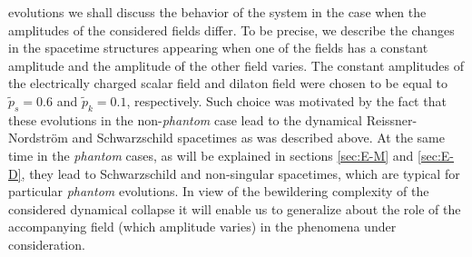\documentclass[aps,showpacs,nofootinbib,floatfix]{revtex4}
\newcommand{\tpe}{{\tilde p}}
\begin{document}
evolutions we shall discuss the behavior of the system in the case when the amplitudes of the considered fields 
differ. To be precise, we describe the changes in the 
spacetime structures appearing when one of the fields has a constant 
amplitude and the amplitude of the other field varies. The constant amplitudes of the electrically charged scalar 
field and dilaton field were chosen to be equal to $\tpe_s=0.6$ and $\tpe_k=0.1$, respectively. Such choice 
was motivated by the fact that these evolutions in the 
non-{\it phantom} case lead to the dynamical Reissner-Nordstr\"{o}m and Schwarzschild spacetimes as was 
described above. At the same time in the {\it phantom} cases, as will be explained in sections \ref{sec:E-M} 
and \ref{sec:E-D}, they lead to Schwarzschild and non-singular spacetimes, which are typical for 
particular {\it phantom} evolutions. 
In view of the bewildering complexity of the considered dynamical collapse it will
enable us to generalize about the role of the accompanying field (which amplitude varies) in the 
phenomena under consideration.


\end{document}
